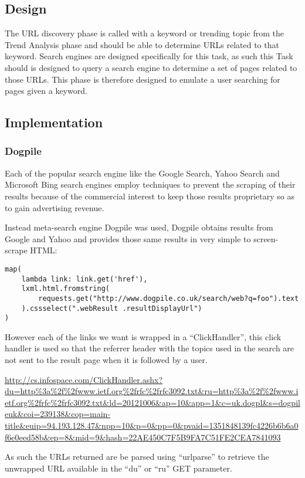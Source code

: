\subsection{Design}
The URL discovery phase is called with a keyword or trending topic from the Trend Analysis phase and should be able to determine URLs related to that keyword.  Search engines are designed specifically for this task, as such this Task should is designed to query a search engine to determine a set of pages related to those URLs. This phase is therefore designed to emulate a user searching for pages given a keyword.

\subsection{Implementation}
\subsubsection{Dogpile}
Each of the popular search engine like the Google Search, Yahoo Search and Microsoft Bing search engines employ techniques to prevent the scraping of their results because of the commercial interest to keep those results proprietary so as to gain advertising revenue.

Instead meta-search engine Dogpile was used, Dogpile obtains results from Google and Yahoo and provides those same results in very simple to screen-scrape HTML\cite{screen-scrape}:

\begin{verbatim}
map(
    lambda link: link.get('href'),
    lxml.html.fromstring(
        requests.get("http://www.dogpile.co.uk/search/web?q=foo").text
    ).cssselect(".webResult .resultDisplayUrl")
)
\end{verbatim}

However each of the links we want is wrapped in a ``ClickHandler'', this click handler is used so that the referrer header with the topics used in the search are not sent to the result page when it is followed by a user.

\url{http://cs.infospace.com/ClickHandler.ashx?du=http%
}

As such the URLs returned are be parsed using ``urlparse'' to retrieve the unwrapped URL available in the ``du'' or ``ru'' GET parameter\cite{rfc3092}.
